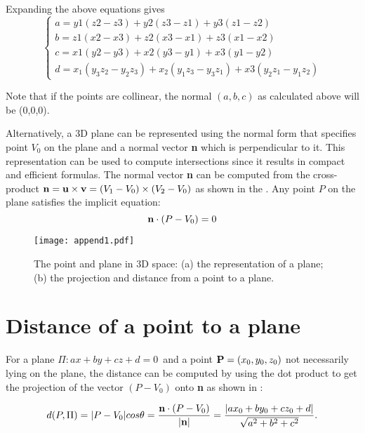Expanding the above equations gives
\begin{equation}
\label{eq:plane_3pts}
\left\{
\begin{array}{lr}
a = y1 (z2 - z3) + y2 (z3 - z1) + y3 (z1 - z2) \\
b = z1 (x2 - x3) + z2 (x3 - x1) + z3 (x1 - x2) \\
c = x1 (y2 - y3) + x2 (y3 - y1) + x3 (y1 - y2) \\
d = x_1(y_3z_2 - y_2z_3) + x_2(y_1z_3 - y_3z_1) + x3(y_2z_1 - y_1z_2)
\end{array}
\right.
\end{equation}

Note that if the points are collinear,
the normal $(a,b,c)$ as calculated above will be (0,0,0).

Alternatively, a 3D plane can be represented using the normal form 
that specifies point $V_0$ on the plane and a normal vector {\bf n}
which is perpendicular to it.  
This representation can be used to compute intersections 
since it results in compact and efficient formulas. 
The normal vector {\bf n} can be computed
from the cross-product 
${\bf n} = {\bf u} \times {\bf v} = (V_1-V_0) \times (V_2-V_0)$
as shown in the .
Any point $P$ on the plane satisfies the implicit equation:
\begin{equation}
\bold n \cdot (P - V_0) = 0
\end{equation}

\begin{figure}[htbp]
\begin{center}
\texttt{[image: append1.pdf]}
\end{center}
\caption{The point and plane in 3D space: 
(a) the representation of a plane;
(b) the projection and distance from a point to a plane.}
\label{fig:apdx1_1}
\end{figure}

\section{Distance of a point to a plane}

For a plane $\Pi : ax + by + cz + d = 0\,$ and a point $\bold P = (x_0,y_0,z_0) $ 
not necessarily lying on the plane, 
the distance can be computed by using the dot product to get the projection 
of the vector $(P-V_0)$ onto {\bf n} as shown in :

\begin{equation}
\label{eq:dist_pt2pl}
d(P, \Pi) = |P - V_0|cos\theta = \frac{\bold n\cdot(P - V_0)}{|\bold n|}
 = \frac{\left | a x_0 + b y_0 + c z_0+d \right |}{\sqrt{a^2+b^2+c^2}}. 
\end{equation}

